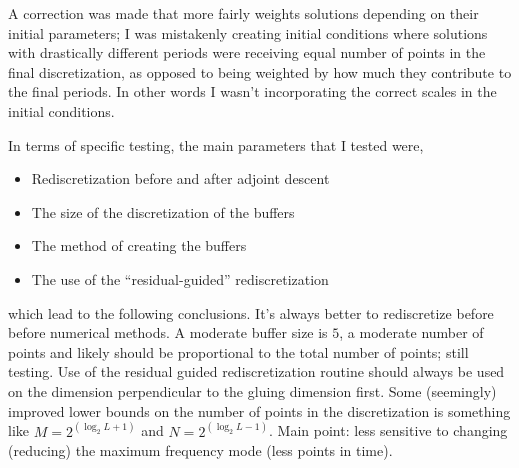 \begin{itemize}
A correction was made that more fairly weights solutions
depending on their initial parameters; I was mistakenly
creating initial conditions where solutions with drastically
different periods were receiving equal number of points
in the final discretization, as opposed to being weighted by
how much they contribute to the final periods. In other
words I wasn't incorporating the correct scales in the
initial conditions.

In terms of specific testing, the main parameters that I tested were,
\begin{itemize}
\item Rediscretization before and after adjoint descent
\item The size of the discretization of the buffers
\item The method of creating the buffers
\item The use of the ``residual-guided'' rediscretization
\end{itemize}

which lead to the following conclusions. It's always better to rediscretize before
before numerical methods. A moderate buffer size is $5$, a moderate number of points and
likely should be proportional to the total number of points; still testing.
Use of the residual guided rediscretization routine should always
be used on the dimension perpendicular to the gluing dimension first.
Some (seemingly) improved lower bounds on the number of points in the discretization
is something like $M = 2^(\log_2 L + 1)$ and $N = 2^(\log_2 L -1)$.
Main point: less sensitive to changing (reducing) the maximum frequency
mode (less points in time).



\end{itemize}
